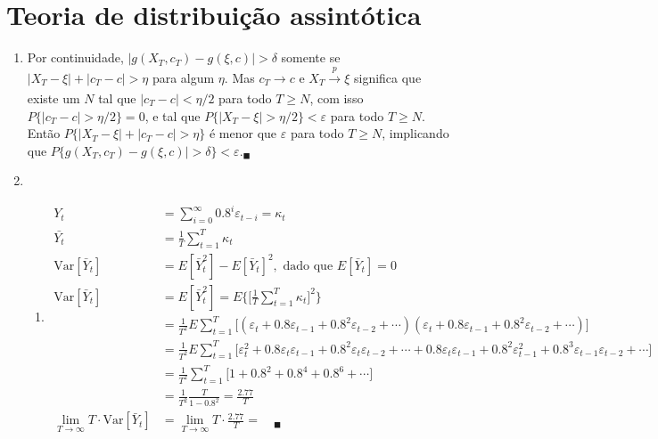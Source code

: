 \chapter{Teoria de distribuição assintótica}

\begin{enumerate}
	\item[\fbox{7.1}]
	Por continuidade, $|g(X_T,c_T)-g(\xi,c)|>\delta$ somente se $|X_T-\xi|+|c_T-c|>\eta$ para algum $\eta$. Mas $c_T \rightarrow c$ e $X_T\xrightarrow[]{p} \xi$ significa que existe um $N$ tal que $|c_T-c|<\eta/2$ para todo $T\geq N$, com isso $P\{|c_T-c|>\eta/2\}=0$, e tal que  $P\{|X_T-\xi|>\eta/2\}<\varepsilon$ para todo $T\geq N$. Então $P\{|X_T-\xi|+|c_T-c|>\eta\}$ é menor que $\varepsilon$ para todo $T\geq N$, implicando que $P\{g(X_T, c_T)-g(\xi, c)|>\delta\}<\varepsilon$.\quad$_{\blacksquare}$
	
	\item[\fbox{7.2}] 
	
	\begin{enumerate}
		\item %
		\begin{align*}
			Y_t&=\sum\limits_{i=0}^{\infty}0.8^i\varepsilon_{t-i}=\kappa_t\\
			\bar{Y_{t}}&=\frac{1}{T}\sum\limits_{t=1}^T\kappa_t\\
			\text{Var}[\bar{Y}_t]&=E[\bar{Y}_t^2]-E[\bar{Y}_t]^2, \text{ dado que }E[\bar{Y}_t]=0\\
			\text{Var}[\bar{Y}_t]&=E[\bar{Y}_t^2]=E\Bigg\{\Bigg[\frac{1}{T}\sum\limits_{t=1}^T\kappa_t\Bigg]^2\Bigg\}\\
			&=\frac{1}{T^2}E\sum\limits_{t=1}^T\bigg[(\varepsilon_t+0.8\varepsilon_{t-1}+0.8^2\varepsilon_{t-2}+\cdots)(\varepsilon_t+0.8\varepsilon_{t-1}+0.8^2\varepsilon_{t-2}+\cdots)\bigg]\\
			&=\frac{1}{T^2}E\sum\limits_{t=1}^T\bigg[\varepsilon_t^2+0.8\varepsilon_t\varepsilon_{t-1}+0.8^2\varepsilon_t\varepsilon_{t-2}+\cdots+0.8\varepsilon_t\varepsilon_{t-1}+0.8^2\varepsilon_{t-1}^2+0.8^3\varepsilon_{t-1}\varepsilon_{t-2}+\cdots\bigg]\\
			&=\frac{1}{T^2}\sum\limits_{t=1}^T\bigg[1+0.8^2+0.8^4+0.8^6+\cdots\bigg]\\
			&=\frac{1}{T^2}\frac{T}{1-0.8^2}=\frac{2.77}{T}\\
			\lim\limits_{T\rightarrow\infty}T\cdot\text{Var}[\bar{Y}_t]&=\lim\limits_{T\rightarrow \infty}T\cdot\frac{2.77}{T}=\quad_{\blacksquare}
		\end{align*}
	

\end{enumerate}
\end{enumerate}
